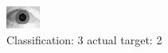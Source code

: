 \begin{figure}[h!]
\begin{center}
\includegraphics[width=0.60\columnwidth]{figures/ID1741_class_3_target_2.png}
\end{center}
\caption{ Classification: 3 actual target: 2}
\label{fig:ID1741_class_3_target_2}
\end{figure}
